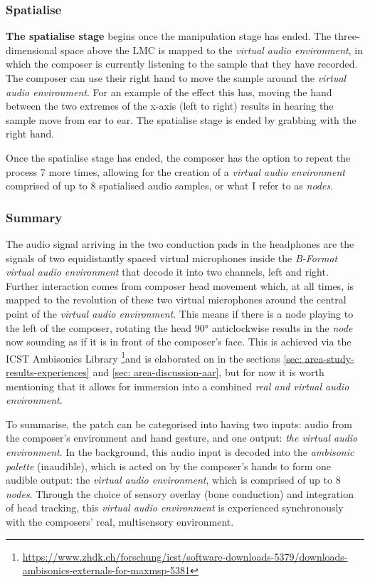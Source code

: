 \subsubsection{Spatialise}                      \label{sec: area-system-software-spatialise}
\textbf{The spatialise stage} begins once the manipulation stage has ended. The three-dimensional space above the LMC is mapped to the \textit{virtual audio environment}, in which the composer is currently listening to the sample that they have recorded. The composer can use their right hand to move the sample around the \textit{virtual audio environment}. For an example of the effect this has, moving the hand between the two extremes of the x-axis (left to right) results in hearing the sample move from ear to ear. The spatialise stage is ended by grabbing with the right hand.

Once the spatialise stage has ended, the composer has the option to repeat the process 7 more times, allowing for the creation of a \textit{virtual audio environment} comprised of up to 8 spatialised audio samples, or what I refer to as \textit{nodes}. 

\subsubsection{Summary}                         \label{sec: area-system-software-summary}
The audio signal arriving in the two conduction pads in the headphones are the signals of two equidistantly spaced virtual microphones inside the \textit{B-Format virtual audio environment} that decode it into two channels, left and right. Further interaction comes from composer head movement which, at all times, is mapped to the revolution of these two virtual microphones around the central point of the \textit{virtual audio environment}. This means if there is a node playing to the left of the composer, rotating the head 90° anticlockwise results in the \textit{node} now sounding as if it is in front of the composer’s face. This is achieved via the ICST Ambisonics Library \citep{schacher2006} \footnote{\url{https://www.zhdk.ch/forschung/icst/software-downloads-5379/downloads-ambisonics-externals-for-maxmsp-5381}}and is elaborated on in the sections \autoref{sec: area-study-results-experiences} and \autoref{sec: area-discussion-aar}, but for now it is worth mentioning that it allows for immersion into a combined \textit{real and virtual audio environment}.

To summarise, the patch can be categorised into having two inputs: audio from the composer’s environment and hand gesture, and one output: \textit{the virtual audio environment}. In the background, this audio input is decoded into the \textit{ambisonic palette} (inaudible), which is acted on by the composer’s hands to form one audible output: the \textit{virtual audio environment}, which is comprised of up to 8 \textit{nodes}. Through the choice of sensory overlay (bone conduction) and integration of head tracking, this \textit{virtual audio environment} is experienced synchronously with the composers’ real, multisensory environment. 



